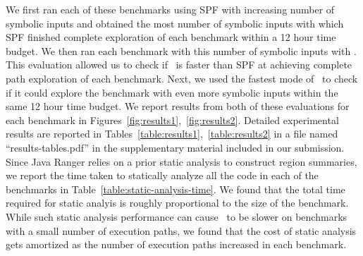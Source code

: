 We first ran each of these benchmarks using SPF with increasing number of symbolic inputs and obtained the most number
of symbolic inputs with which SPF finished complete exploration of each benchmark within a 12 hour time budget.
%
We then ran each benchmark with this number of symbolic inputs with \tool.
%
This evaluation allowed us to check if \tool\ is faster than SPF at achieving complete path exploration of each benchmark.
%
Next, we used the fastest mode of \tool\ to check if it could explore the benchmark with even more symbolic inputs within
the same 12 hour time budget.
%
We report results from both of these evaluations for each benchmark in Figures~\ref{fig:results1},~\ref{fig:results2}.
%
Detailed experimental results are reported in Tables~\ref{table:results1},~\ref{table:results2} in a file named
``results-tables.pdf'' in the supplementary material included in our submission.
%
Since Java Ranger relies on a prior static analysis to construct region summaries, we report the time taken to statically
analyze all the code in each of the benchmarks in Table~\ref{table:static-analysis-time}.
%
We found that the total time required for static analyis is roughly proportional to the size of the benchmark.
%
While such static analysis performance can cause \tool\ to be slower on benchmarks with a small number of execution
paths, we found that the cost of static analysis gets amortized as the number of execution paths increased in each benchmark.
%
